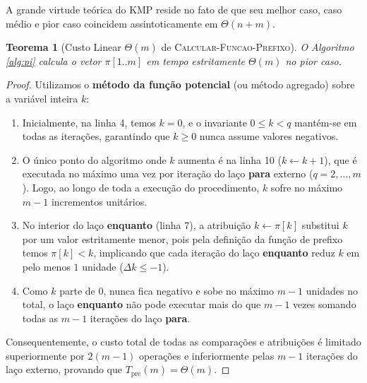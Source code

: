 \documentclass[12pt,a4paper]{article}
\newtheorem{teorema}{Teorema}[section]
\begin{document}
A grande virtude te\'orica do KMP reside no fato de que seu melhor caso, caso m\'edio e pior caso coincidem assintoticamente em $\Theta(n + m)$.

\begin{teorema}[Custo Linear $\Theta(m)$ de \textsc{Calcular-Funcao-Prefixo}]
O Algoritmo \ref{alg:pi} calcula o vetor $\pi[1..m]$ em tempo estritamente $\Theta(m)$ no pior caso.
\end{teorema}
\begin{proof}
Utilizamos o \textbf{m\'etodo da fun\c{c}\~ao potencial} (ou m\'etodo agregado) sobre a vari\'avel inteira $k$:
\begin{enumerate}
    \item Inicialmente, na linha 4, temos $k = 0$, e o invariante $0 \le k < q$ mant\'em-se em todas as itera\c{c}\~oes, garantindo que $k \ge 0$ nunca assume valores negativos.
    \item O \'unico ponto do algoritmo onde $k$ aumenta \'e na linha 10 ($k \leftarrow k + 1$), que \'e executada no m\'aximo uma vez por itera\c{c}\~ao do la\c{c}o \textbf{para} externo ($q = 2, \dots, m$). Logo, ao longo de toda a execu\c{c}\~ao do procedimento, $k$ sofre no m\'aximo $m - 1$ incrementos unit\'arios.
    \item No interior do la\c{c}o \textbf{enquanto} (linha 7), a atribui\c{c}\~ao $k \leftarrow \pi[k]$ substitui $k$ por um valor estritamente menor, pois pela defini\c{c}\~ao da fun\c{c}\~ao de prefixo temos $\pi[k] < k$, implicando que cada itera\c{c}\~ao do la\c{c}o \textbf{enquanto} reduz $k$ em pelo menos $1$ unidade ($\Delta k \le -1$).
    \item Como $k$ parte de $0$, nunca fica negativo e sobe no m\'aximo $m - 1$ unidades no total, o la\c{c}o \textbf{enquanto} n\~ao pode executar mais do que $m - 1$ vezes somando todas as $m - 1$ itera\c{c}\~oes do la\c{c}o \textbf{para}.
\end{enumerate}
Consequentemente, o custo total de todas as compara\c{c}\~oes e atribui\c{c}\~oes \'e limitado superiormente por $2(m - 1)$ opera\c{c}\~oes e inferiormente pelas $m - 1$ itera\c{c}\~oes do la\c{c}o externo, provando que $T_{\text{pre}}(m) = \Theta(m)$.
\end{proof}
\end{document}
